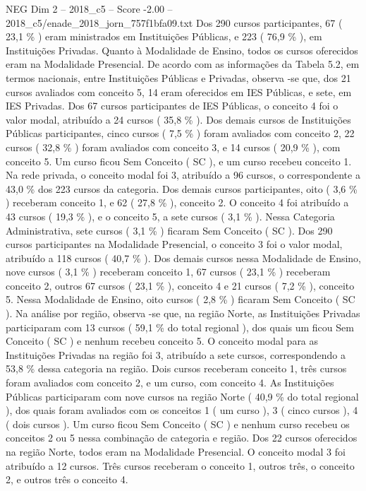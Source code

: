 \begin{textsample}{NEG Dim 2 – 2018\_c5 – Score -2.00 – 2018\_c5/enade\_2018\_jorn\_757f1bfa09.txt}
Dos 290 cursos participantes, 67 ( 23,1 \% ) eram ministrados em Instituições Públicas, e 223 ( 76,9 \% ), em Instituições Privadas.
Quanto à Modalidade de Ensino, todos os cursos oferecidos eram na Modalidade Presencial.
De acordo com as informações da Tabela 5.2, em termos nacionais, entre Instituições Públicas e Privadas, observa -se que, dos 21 cursos avaliados com conceito 5, 14 eram oferecidos em IES Públicas, e sete, em IES Privadas.
Dos 67 cursos participantes de IES Públicas, o conceito 4 foi o valor modal, atribuído a 24 cursos ( 35,8 \% ).
Dos demais cursos de Instituições Públicas participantes, cinco cursos ( 7,5 \% ) foram avaliados com conceito 2, 22 cursos ( 32,8 \% ) foram avaliados com conceito 3, e 14 cursos ( 20,9 \% ), com conceito 5.
Um curso ficou Sem Conceito ( SC ), e um curso recebeu conceito 1.
Na rede privada, o conceito modal foi 3, atribuído a 96 cursos, o correspondente a 43,0 \% dos 223 cursos da categoria.
Dos demais cursos participantes, oito ( 3,6 \% ) receberam conceito 1, e 62 ( 27,8 \% ), conceito 2.
O conceito 4 foi atribuído a 43 cursos ( 19,3 \% ), e o conceito 5, a sete cursos ( 3,1 \% ).
Nessa Categoria Administrativa, sete cursos ( 3,1 \% ) ficaram Sem Conceito ( SC ).
Dos 290 cursos participantes na Modalidade Presencial, o conceito 3 foi o valor modal, atribuído a 118 cursos ( 40,7 \% ).
Dos demais cursos nessa Modalidade de Ensino, nove cursos ( 3,1 \% ) receberam conceito 1, 67 cursos ( 23,1 \% ) receberam conceito 2, outros 67 cursos ( 23,1 \% ), conceito 4 e 21 cursos ( 7,2 \% ), conceito 5.
Nessa Modalidade de Ensino, oito cursos ( 2,8 \% ) ficaram Sem Conceito ( SC ).
Na análise por região, observa -se que, na região Norte, as Instituições Privadas participaram com 13 cursos ( 59,1 \% do total regional ), dos quais um ficou Sem Conceito ( SC ) e nenhum recebeu conceito 5.
O conceito modal para as Instituições Privadas na região foi 3, atribuído a sete cursos, correspondendo a 53,8 \% dessa categoria na região.
Dois cursos receberam conceito 1, três cursos foram avaliados com conceito 2, e um curso, com conceito 4.
As Instituições Públicas participaram com nove cursos na região Norte ( 40,9 \% do total regional ), dos quais foram avaliados com os conceitos 1 ( um curso ), 3 ( cinco cursos ), 4 ( dois cursos ).
Um curso ficou Sem Conceito ( SC ) e nenhum curso recebeu os conceitos 2 ou 5 nessa combinação de categoria e região.
Dos 22 cursos oferecidos na região Norte, todos eram na Modalidade Presencial.
O conceito modal 3 foi atribuído a 12 cursos.
Três cursos receberam o conceito 1, outros três, o conceito 2, e outros três o conceito 4.

\end{textsample}
